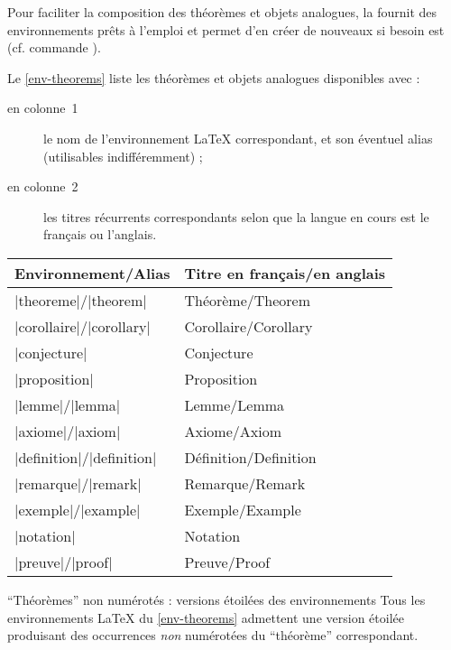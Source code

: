 Pour faciliter la composition des théorèmes et objets analogues, la
\gztauthorcl{} fournit des environnements prêts à l'emploi et permet d'en créer
de nouveaux si besoin est (cf. commande ).

Le \vref{env-theorems} liste les théorèmes et objets analogues disponibles
%
avec :
\begin{description}
\item[en colonne~1] le nom de l'environnement \LaTeX{} correspondant, et son
  éventuel alias (utilisables indifféremment) ;
\item[en colonne~2] les titres récurrents correspondants selon que la langue en
  cours est le français ou l'anglais.
\end{description}

\begin{gzttable}[label=env-theorems,title=Environnements de type \enquote{théorème} fournis]
  \begin{tabular}{ll}
    Environnement/Alias       & Titre en français/en anglais \\\toprule
    |theoreme|/|theorem|      & Théorème/Theorem          \\\midrule
    |corollaire|/|corollary|  & Corollaire/Corollary      \\\midrule
    |conjecture|              & Conjecture                \\\midrule
    |proposition|             & Proposition               \\\midrule
    |lemme|/|lemma|           & Lemme/Lemma               \\\midrule
    |axiome|/|axiom|          & Axiome/Axiom              \\\midrule[.75pt]
    |definition|/|definition| & Définition/Definition     \\\midrule
    |remarque|/|remark|       & Remarque/Remark           \\\midrule
    |exemple|/|example|       & Exemple/Example           \\\midrule
    |notation|                & Notation                  \\\midrule[.75pt]
    |preuve|/|proof|          & Preuve/Proof              \\\bottomrule
  \end{tabular}
\end{gzttable}

\begin{dbremark}{\enquote{Théorèmes} non numérotés : versions étoilées des
    environnements}{}
  Tous les environnements \LaTeX{} du \vref{env-theorems} admettent une version
  étoilée produisant des occurrences \emph{non} numérotées du \enquote{théorème}
  correspondant.
\end{dbremark}

